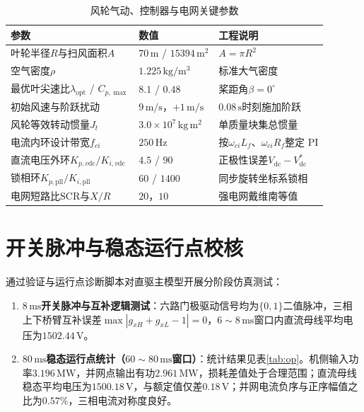 \documentclass[UTF8,zihao=-4,fontset=none]{ctexrep}
\begin{document}
\begin{table}[H]
\centering
\caption{风轮气动、控制器与电网关键参数}
\label{tab:dd_ctrl_param}
\begin{tabular}{p{5.4cm}p{3.4cm}p{3.6cm}}
\toprule
参数 & 数值 & 工程说明\\
\midrule
叶轮半径\(R\)与扫风面积\(A\) & \(70\,\mathrm{m}\) / \(15394\,\mathrm{m^2}\) & \(A=\pi R^2\)\\
空气密度\(\rho\) & \(1.225\,\mathrm{kg/m^3}\) & 标准大气密度\\
最优叶尖速比\(\lambda_{\mathrm{opt}}\) / \(C_{p,\max}\) & \(8.1\) / \(0.48\) & 桨距角\(\beta=0^\circ\)\\
初始风速与阶跃扰动 & \(9\,\mathrm{m/s}\)，\(+1\,\mathrm{m/s}\) & \(0.08\,\mathrm{s}\)时刻施加阶跃\\
风轮等效转动惯量\(J_t\) & \(3.0\times10^7\,\mathrm{kg\,m^2}\) & 单质量块集总惯量\\
电流内环设计带宽\(f_{ci}\) & \(250\,\mathrm{Hz}\) & 按\(\omega_{ci}L_f\)、\(\omega_{ci}R_f\)整定 PI\\
直流电压外环\(K_{p,v\mathrm{dc}}/K_{i,v\mathrm{dc}}\) & \(4.5\) / \(90\) & 正极性误差\(V_{\mathrm{dc}}-V_{\mathrm{dc}}^*\)\\
锁相环\(K_{p,\mathrm{pll}}/K_{i,\mathrm{pll}}\) & \(60\) / \(1400\) & 同步旋转坐标系锁相\\
电网短路比\(\mathrm{SCR}\)与\(X/R\) & \(20\)，\(10\) & 强电网戴维南等值\\
\bottomrule
\end{tabular}
\end{table}

\section{开关脉冲与稳态运行点校核}
通过验证与运行点诊断脚本对直驱主模型开展分阶段仿真测试：
\begin{enumerate}
  \item \textbf{\(8\,\mathrm{ms}\)开关脉冲与互补逻辑测试}：六路门极驱动信号均为\(\{0,1\}\)二值脉冲，三相上下桥臂互补误差\(\max|g_{xH}+g_{xL}-1|=0\)，\(6\sim8\,\mathrm{ms}\)窗口内直流母线平均电压为\(1502.44\,\mathrm{V}\)。
  \item \textbf{\(80\,\mathrm{ms}\)稳态运行点统计（\(60\sim80\,\mathrm{ms}\)窗口）}：统计结果见表\ref{tab:op}。机侧输入功率\(3.196\,\mathrm{MW}\)，并网点输出有功\(2.961\,\mathrm{MW}\)，损耗差值处于合理范围；直流母线稳态平均电压为\(1500.18\,\mathrm{V}\)，与额定值仅差\(0.18\,\mathrm{V}\)；并网电流负序与正序幅值之比为\(0.57\%\)，三相电流对称度良好。
\end{enumerate}
\end{document}
